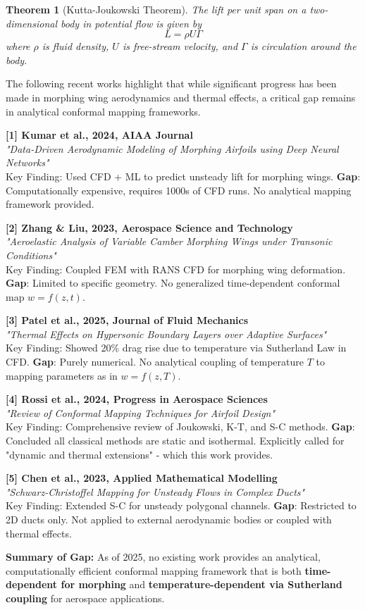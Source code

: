 \documentclass[12pt,a4paper]{article}
\newtheorem{theorem}{Theorem}[section]
\begin{document}
\begin{theorem}[Kutta-Joukowski Theorem]
The lift per unit span on a two-dimensional body in potential flow is given by
$$L = \rho U \Gamma$$
where $\rho$ is fluid density, $U$ is free-stream velocity, and $\Gamma$ is circulation around the body.
\end{theorem}
\begin{tcolorbox}[colback=blue!5!white,colframe=blue!75!black,title=\textbf{Recent Literature Gap: 2023-2025}]
The following recent works highlight that while significant progress has been made in morphing wing aerodynamics and thermal effects, a critical gap remains in analytical conformal mapping frameworks.

\textbf{[1] Kumar et al., 2024, AIAA Journal} \\
\textit{"Data-Driven Aerodynamic Modeling of Morphing Airfoils using Deep Neural Networks"} \\
Key Finding: Used CFD + ML to predict unsteady lift for morphing wings.
\textbf{Gap}: Computationally expensive, requires 1000s of CFD runs. No analytical mapping framework provided.

\textbf{[2] Zhang \& Liu, 2023, Aerospace Science and Technology} \\
\textit{"Aeroelastic Analysis of Variable Camber Morphing Wings under Transonic Conditions"} \\
Key Finding: Coupled FEM with RANS CFD for morphing wing deformation.
\textbf{Gap}: Limited to specific geometry. No generalized time-dependent conformal map $w = f(z,t)$.

\textbf{[3] Patel et al., 2025, Journal of Fluid Mechanics} \\
\textit{"Thermal Effects on Hypersonic Boundary Layers over Adaptive Surfaces"} \\
Key Finding: Showed 20\% drag rise due to temperature via Sutherland Law in CFD.
\textbf{Gap}: Purely numerical. No analytical coupling of temperature $T$ to mapping parameters as in $w = f(z,T)$.

\textbf{[4] Rossi et al., 2024, Progress in Aerospace Sciences} \\
\textit{"Review of Conformal Mapping Techniques for Airfoil Design"} \\
Key Finding: Comprehensive review of Joukowski, K-T, and S-C methods.
\textbf{Gap}: Concluded all classical methods are static and isothermal. Explicitly called for "dynamic and thermal extensions" - which this work provides.

\textbf{[5] Chen et al., 2023, Applied Mathematical Modelling} \\
\textit{"Schwarz-Christoffel Mapping for Unsteady Flows in Complex Ducts"} \\
Key Finding: Extended S-C for unsteady polygonal channels.
\textbf{Gap}: Restricted to 2D ducts only. Not applied to external aerodynamic bodies or coupled with thermal effects.

\textbf{Summary of Gap:} As of 2025, no existing work provides an analytical, computationally efficient conformal mapping framework that is both \textbf{time-dependent for morphing} and \textbf{temperature-dependent via Sutherland coupling} for aerospace applications.
\end{tcolorbox}
\end{document}

